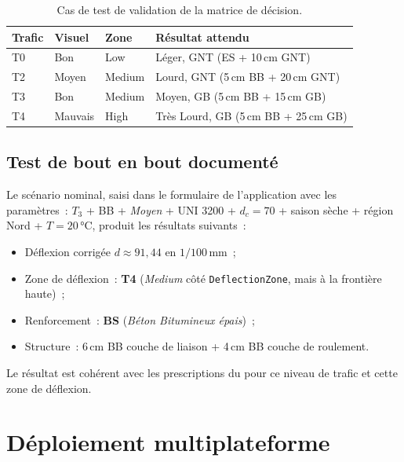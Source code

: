 \begin{table}[H]
\centering
\caption{Cas de test de validation de la matrice de décision.}
\label{tab:cas-test}
\small
\begin{tabular}{@{}lllp{5.5cm}@{}}
\toprule
\bfseries Trafic & \bfseries Visuel & \bfseries Zone & \bfseries Résultat attendu \\
\midrule
T0 & Bon & Low     & Léger, GNT (ES + 10\,cm GNT) \\
T2 & Moyen & Medium & Lourd, GNT (5\,cm BB + 20\,cm GNT) \\
T3 & Bon & Medium  & Moyen, GB (5\,cm BB + 15\,cm GB) \\
T4 & Mauvais & High & Très Lourd, GB (5\,cm BB + 25\,cm GB) \\
\bottomrule
\end{tabular}
\end{table}

\subsection{Test de bout en bout documenté}
\label{sec:e2e}

Le scénario nominal, saisi dans le formulaire de l'application avec
les paramètres~: $T_3$ + BB + \textit{Moyen} + UNI 3200 + $d_c = 70$
+ saison sèche + région Nord + $T = 20$\,\si{\celsius}, produit les
résultats suivants~:

\begin{itemize}
  \item Déflexion corrigée $d \approx 91{,}44$ en $1/100$\,mm~;
  \item Zone de déflexion~: \textbf{T4} (\textit{Medium} côté
        \texttt{DeflectionZone}, mais à la frontière haute)~;
  \item Renforcement~: \textbf{BS} (\textit{Béton Bitumineux épais})~;
  \item Structure~: 6\,cm BB couche de liaison + 4\,cm BB couche de
        roulement.
\end{itemize}

Le résultat est cohérent avec les prescriptions du \cttp{} pour ce
niveau de trafic et cette zone de déflexion.


\section{Déploiement multiplateforme}
\label{sec:deploiement}


